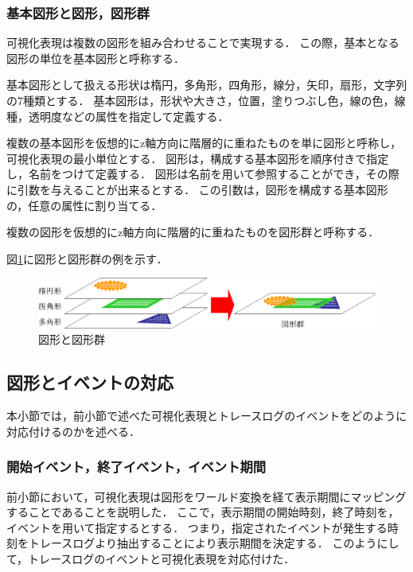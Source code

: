 \subsubsection{基本図形と図形，図形群}
可視化表現は複数の図形を組み合わせることで実現する．
この際，基本となる図形の単位を基本図形と呼称する．

基本図形として扱える形状は楕円，多角形，四角形，線分，矢印，扇形，文字列の7種類とする．
基本図形は，形状や大きさ，位置，塗りつぶし色，線の色，線種，透明度などの属性を指定して定義する．

複数の基本図形を仮想的にz軸方向に階層的に重ねたものを単に図形と呼称し，可視化表現の最小単位とする．
図形は，構成する基本図形を順序付きで指定し，名前をつけて定義する．
図形は名前を用いて参照することができ，その際に引数を与えることが出来るとする．
この引数は，図形を構成する基本図形の，任意の属性に割り当てる．

複数の図形を仮想的にz軸方向に階層的に重ねたものを図形群と呼称する．

図\ref{fig:shapes}に図形と図形群の例を示す．

\begin{figure}[p]
\begin{center}
\includegraphics[scale=0.75]{img/shapes.eps}
\caption{図形と図形群}
\label{fig:shapes}
\end{center}
\end{figure}

\subsection{図形とイベントの対応}

本小節では，前小節で述べた可視化表現とトレースログのイベントをどのように対応付けるのかを述べる．

\subsubsection{開始イベント，終了イベント，イベント期間}
前小節において，可視化表現は図形をワールド変換を経て表示期間にマッピングすることであることを説明した．
ここで，表示期間の開始時刻，終了時刻を，イベントを用いて指定するとする．
つまり，指定されたイベントが発生する時刻をトレースログより抽出することにより表示期間を決定する．
このようにして，トレースログのイベントと可視化表現を対応付けた．

